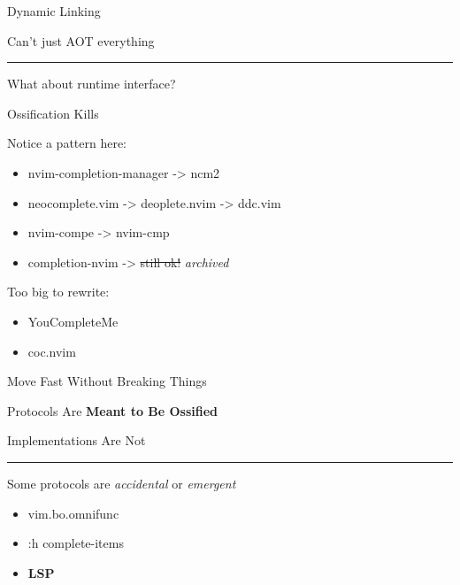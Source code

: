 \documentclass{beamer}
\begin{document}
\begin{frame}{Dynamic Linking}

	Can't just AOT everything

	\rule{\textwidth}{0.1em}

	What about runtime interface?

\end{frame}


\begin{frame}{Ossification Kills}

	Notice a pattern here:

	\begin{itemize}

		\item nvim-completion-manager -> ncm2

		\item neocomplete.vim -> deoplete.nvim -> ddc.vim

		\item nvim-compe -> nvim-cmp

		\item completion-nvim -> \st{still ok!} \textit{archived}

	\end{itemize}

	Too big to rewrite:

	\begin{itemize}

		\item YouCompleteMe

		\item coc.nvim

	\end{itemize}

\end{frame}


\begin{frame}[standout]

	Move Fast Without Breaking Things

\end{frame}


\begin{frame}{Protocols Are \textbf{Meant to Be Ossified}}

	Implementations Are Not

	\rule{\textwidth}{0.1em}

	Some protocols are \textit{accidental} or \textit{emergent}

	\begin{itemize}

		\item vim.bo.omnifunc

		\item :h complete-items

		\item \textbf{LSP}

	\end{itemize}

\end{frame}
\end{document}
